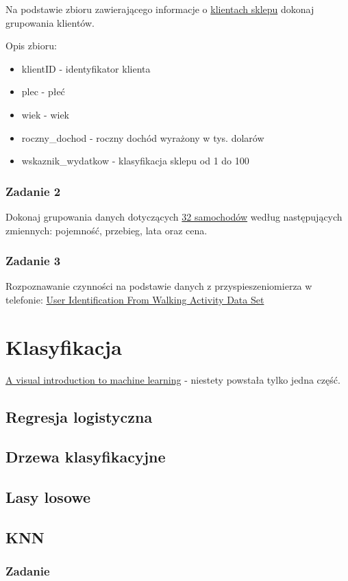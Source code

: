\documentclass[]{book}
\providecommand{\tightlist}{%
  \setlength{\itemsep}{0pt}\setlength{\parskip}{0pt}}
\begin{document}
Na podstawie zbioru zawierającego informacje o
\href{data/klienci.csv}{klientach sklepu} dokonaj grupowania klientów.

Opis zbioru:

\begin{itemize}
\tightlist
\item
  klientID - identyfikator klienta
\item
  plec - płeć
\item
  wiek - wiek
\item
  roczny\_dochod - roczny dochód wyrażony w tys. dolarów
\item
  wskaznik\_wydatkow - klasyfikacja sklepu od 1 do 100
\end{itemize}

\subsection{Zadanie 2}\label{zadanie-2-1}

Dokonaj grupowania danych dotyczących \href{data/auta.csv}{32
samochodów} według następujących zmiennych: pojemność, przebieg, lata
oraz cena.

\subsection{Zadanie 3}\label{zadanie-3}

Rozpoznawanie czynności na podstawie danych z przyspieszeniomierza w
telefonie:
\href{http://archive.ics.uci.edu/ml/datasets/User+Identification+From+Walking+Activity\#}{User
Identification From Walking Activity Data Set}

\chapter{Klasyfikacja}\label{klasyfikacja}

\href{http://www.r2d3.us/visual-intro-to-machine-learning-part-1/}{A
visual introduction to machine learning} - niestety powstała tylko jedna
część.

\section{Regresja logistyczna}\label{regresja-logistyczna}

\section{Drzewa klasyfikacyjne}\label{drzewa-klasyfikacyjne}

\section{Lasy losowe}\label{lasy-losowe}

\section{KNN}\label{knn}

\subsection{Zadanie}\label{zadanie-4}
\end{document}
